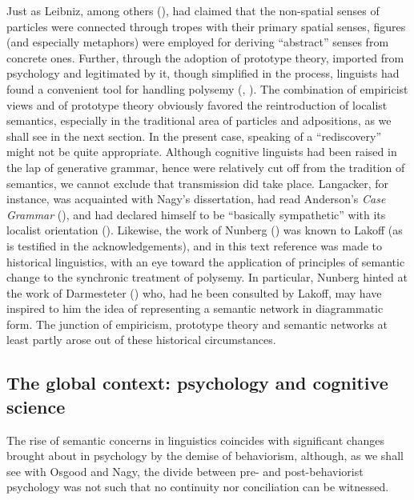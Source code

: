 \documentclass[output=paper]{langscibook}
\begin{document}
Just as Leibniz, among others (\citealt{leibniz_lingua_1923}), had claimed that the non-spatial senses of particles were connected through tropes with their primary spatial senses, figures (and especially metaphors) were employed for deriving “abstract” senses from concrete ones. Further, through the adoption of prototype theory, imported from psychology and legitimated by it, though simplified in the process, linguists had found a convenient tool for handling polysemy (\citealt{kleiber_semantique_1990}, \citealt{arigne_prototype_2018}). The combination of empiricist views and of prototype theory obviously favored the reintroduction of localist semantics, especially in the traditional area of particles and adpositions, as we shall see in the next section. In the present case, speaking of a “rediscovery” might not be quite appropriate. Although cognitive linguists had been raised in the lap of generative grammar, hence were relatively cut off from the tradition of semantics, we cannot exclude that transmission did take place. Langacker, for instance, was acquainted with Nagy’s dissertation, had read Anderson’s \textit{Case Grammar} (\citeyear{anderson_grammar_1971}), and had declared himself to be “basically sympathetic” with its localist orientation (\citeyear{anderson_essay_1973}). Likewise, the work of Nunberg (\citeyear{nunberg_pragmatics_1978}) was known to Lakoff (as is testified in the acknowledgements), and in this text reference was made to historical linguistics, with an eye toward the application of principles of semantic change to the synchronic treatment of polysemy. In particular, Nunberg hinted at the work of Darmesteter (\citeyear{darmesteter_vie_1887}) who, had he been consulted by Lakoff, may have inspired to him the idea of representing a semantic network in diagrammatic form. The junction of empiricism, prototype theory and semantic networks at least partly arose out of these historical circumstances.

\subsection{The global context: psychology and cognitive science}

The rise of semantic concerns in linguistics coincides with significant changes brought about in psychology by the demise of behaviorism, although, as we shall see with Osgood and Nagy, the divide between pre- and post-behaviorist psychology was not such that no continuity nor conciliation can be witnessed.
\end{document}
